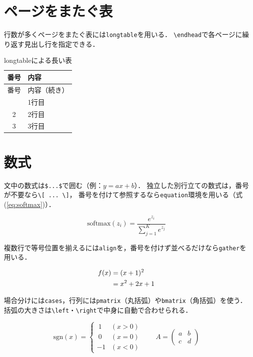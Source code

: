 \section{ページをまたぐ表}
\label{sec:longtable}
行数が多くページをまたぐ表には\texttt{longtable}を用いる．
\verb|\endhead|で各ページに繰り返す見出し行を指定できる．

\begin{longtable}{cl}
    \caption{longtableによる長い表}\label{tab:long}\\
    \toprule 番号 & 内容 \\ \midrule
    \endfirsthead
    \toprule 番号 & 内容（続き） \\ \midrule
    \endhead
    \bottomrule
    \endfoot
    1 & 1行目 \\
    2 & 2行目 \\
    3 & 3行目 \\
\end{longtable}

\section{数式}
\label{sec:math}
文中の数式は\verb|$...$|で囲む（例：$y = ax + b$）．
独立した別行立ての数式は，番号が不要なら\verb|\[ ... \]|，
番号を付けて参照するなら\texttt{equation}環境を用いる（式(\ref{eq:softmax})）．

\begin{equation}
    \label{eq:softmax}
    \mathrm{softmax}(z_i) = \frac{e^{z_i}}{\sum_{j=1}^{K} e^{z_j}}
\end{equation}

複数行で等号位置を揃えるには\texttt{align}を，番号を付けず並べるだけなら\texttt{gather}を用いる．

\begin{align}
    f(x) &= (x+1)^2 \notag \\
         &= x^2 + 2x + 1
\end{align}

場合分けには\texttt{cases}，行列には\texttt{pmatrix}（丸括弧）や\texttt{bmatrix}（角括弧）を使う．
括弧の大きさは\verb|\left|・\verb|\right|で中身に自動で合わせられる．

\begin{equation}
    \mathrm{sgn}(x) =
    \begin{cases}
        \ 1  & (x > 0) \\
        \ 0  & (x = 0) \\
        -1   & (x < 0)
    \end{cases}
    \qquad
    A = \left( \begin{matrix} a & b \\ c & d \end{matrix} \right)
\end{equation}

